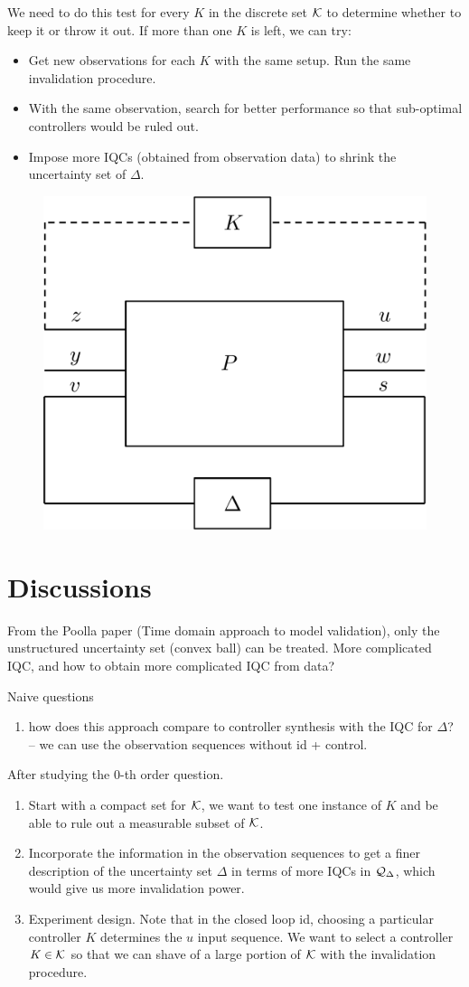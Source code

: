 \documentclass[11pt, onecolumn]{article}
\begin{document}
We need to do this test for every $K$ in the discrete set $\mathcal K$ to determine whether to keep it or
throw it out. If more than one $K$ is left, we can try:
\begin{itemize}
\item Get new observations for each $K$ with the same setup. Run the same invalidation procedure.
\item With the same observation, search for better performance so that sub-optimal controllers would
  be ruled out.
\item Impose more IQCs (obtained from observation data) to shrink the uncertainty set of $\Delta$.
\end{itemize}



\begin{figure}[h!]
  \centering
  \includegraphics[width=.4\linewidth]{sys1.pdf}
\end{figure}




\section{Discussions}

From the Poolla paper (Time domain approach to model validation), only the unstructured uncertainty
set (convex ball) can be treated. More complicated IQC, and how to obtain more complicated IQC from data?


Naive questions
\begin{enumerate}
\item how does this approach compare to controller synthesis with the IQC for $\Delta$? -- we can
  use the observation sequences without id + control.
\end{enumerate}


After studying the 0-th order question.
\begin{enumerate}
\item Start with a compact set for $\mathcal K$, we want to test one instance of $K$ and be able to rule
  out a measurable subset of $\mathcal K$.
\item Incorporate the information in the observation sequences to get a finer description of the
  uncertainty set $\Delta$ in terms of more IQCs in $\mathcal Q_{\Delta}$, which would give us more
  invalidation power.
\item Experiment design. Note that in the closed loop id, choosing a particular controller $K$
  determines the $u$ input sequence. We want to select a controller $K\in \mathcal K$ so that we can
  shave of a large portion of $\mathcal K$ with the invalidation procedure.
\end{enumerate}








\end{document}

